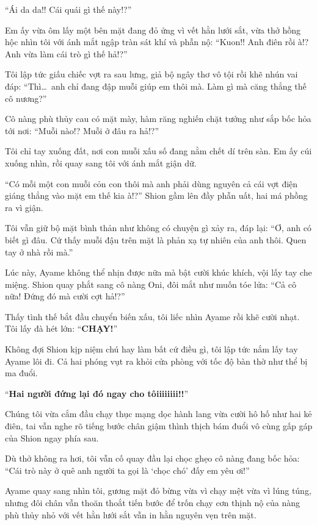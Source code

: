 \documentclass[../main.tex]{subfiles}
\begin{document}
``Ái da da!! Cái quái gì thế này!?''

Em ấy vừa ôm lấy một bên mặt đang đỏ ửng vì vết hằn lưới sắt, vừa thở hồng hộc nhìn tôi với ánh mắt ngập tràn sát khí và phẫn nộ: ``Kuon!! Anh điên rồi à!? Anh vừa làm cái trò gì thế hả!?''

Tôi lập tức giấu chiếc vợt ra sau lưng, giả bộ ngây thơ vô tội rồi khẽ nhún vai đáp: ``Thì\dots\ anh chỉ đang đập muỗi giúp em thôi mà. Làm gì mà căng thẳng thế cô nương?''

Cô nàng phù thủy cau có mặt mày, hàm răng nghiến chặt tưởng như sắp bốc hỏa tới nơi: ``Muỗi nào!? Muỗi ở đâu ra hả!?''

Tôi chỉ tay xuống đất, nơi con muỗi xấu số đang nằm chết dí trên sàn. Em ấy cúi xuống nhìn, rồi quay sang tôi với ánh mắt giận dữ.

``Có mỗi một con muỗi cỏn con thôi mà anh phải dùng nguyên cả cái vợt điện giáng thẳng vào mặt em thế kia à!?'' Shion gầm lên đầy phẫn uất, hai má phồng ra vì giận.

Tôi vẫn giữ bộ mặt bình thản như không có chuyện gì xảy ra, đáp lại: ``Ơ, anh có biết gì đâu. Cứ thấy muỗi đậu trên mặt là phản xạ tự nhiên của anh thôi. Quen tay ở nhà rồi mà.''

Lúc này, Ayame không thể nhịn được nữa mà bật cười khúc khích, vội lấy tay che miệng. Shion quay phắt sang cô nàng Oni, đôi mắt như muốn tóe lửa: ``Cả cô nữa! Đứng đó mà cười cợt hả!?''

Thấy tình thế bắt đầu chuyển biến xấu, tôi liếc nhìn Ayame rồi khẽ cười nhạt. Tôi lấy đà hét lớn: ``\textbf{CHẠY!}''

Không đợi Shion kịp niệm chú hay làm bất cứ điều gì, tôi lập tức nắm lấy tay Ayame lôi đi. Cả hai phóng vụt ra khỏi cửa phòng với tốc độ bàn thờ như thể bị ma đuổi.

``\textbf{Hai người đứng lại đó ngay cho tôiiiiiiii!!}''

Chúng tôi vừa cắm đầu chạy thục mạng dọc hành lang vừa cười hô hố như hai kẻ điên, tai vẫn nghe rõ tiếng bước chân giậm thình thịch bám đuổi vô cùng gấp gáp của Shion ngay phía sau.

Dù thở không ra hơi, tôi vẫn cố quay đầu lại chọc ghẹo cô nàng đang bốc hỏa: ``Cái trò này ở quê anh người ta gọi là `chọc chó' đấy em yêu ơi!''

Ayame quay sang nhìn tôi, gương mặt đỏ bừng vừa vì chạy mệt vừa vì lúng túng, nhưng đôi chân vẫn thoăn thoắt tiến bước để trốn chạy cơn thịnh nộ của nàng phù thủy nhỏ với vết hằn lưới sắt vẫn in hằn nguyên vẹn trên mặt.
\end{document}
